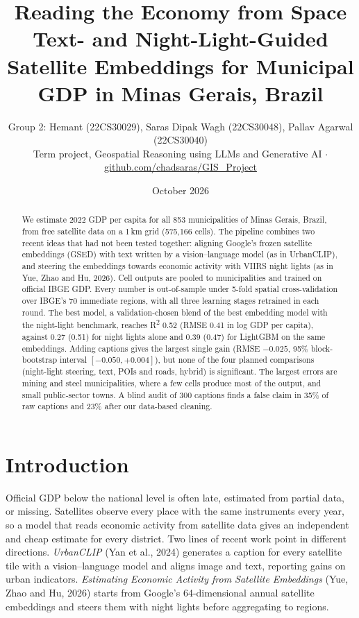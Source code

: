 \documentclass[11pt,a4paper]{article}
\title{\textbf{Reading the Economy from Space}\\[4pt]
\large Text- and Night-Light-Guided Satellite Embeddings for Municipal GDP in Minas Gerais, Brazil}
\author{Group 2: Hemant (22CS30029), Saras Dipak Wagh (22CS30048), Pallav Agarwal (22CS30040)\\[2pt]
\small Term project, Geospatial Reasoning using LLMs and Generative AI \quad$\cdot$\quad
\href{https://github.com/chadsaras/GIS_Project}{github.com/chadsaras/GIS\_Project}}
\date{October 2026}
\newcommand{\R}{R\textsuperscript{2}}
\begin{document}
\maketitle

\begin{abstract}
\noindent
We estimate 2022 GDP per capita for all 853 municipalities of Minas Gerais, Brazil, from free satellite data on a
1\,km grid (575{,}166 cells). The pipeline combines two recent ideas that had not been tested together: aligning
Google's frozen satellite embeddings (GSED) with text written by a vision--language model (as in UrbanCLIP), and
steering the embeddings towards economic activity with VIIRS night lights (as in Yue, Zhao and Hu, 2026).
Cell outputs are pooled to municipalities and trained on official IBGE GDP. Every number is out-of-sample under
5-fold spatial cross-validation over IBGE's 70 immediate regions, with all three learning stages retrained in each
round. The best model, a validation-chosen blend of the best embedding model with the night-light benchmark,
reaches \R{} 0.52 (RMSE 0.41 in log GDP per capita), against 0.27 (0.51) for night lights alone and 0.39 (0.47) for
LightGBM on the same embeddings. Adding captions gives the largest single gain (RMSE $-0.025$, 95\% block-bootstrap
interval $[-0.050, +0.004]$), but none of the four planned comparisons (night-light steering, text, POIs and roads,
hybrid) is significant. The largest errors are mining and steel municipalities, where a few cells produce most of
the output, and small public-sector towns. A blind audit of 300 captions finds a false claim in 35\% of raw
captions and 23\% after our data-based cleaning.
\end{abstract}

\section{Introduction}

Official GDP below the national level is often late, estimated from partial data, or missing. Satellites observe
every place with the same instruments every year, so a model that reads economic activity from satellite data gives
an independent and cheap estimate for every district. Two lines of recent work point in different directions.
\emph{UrbanCLIP} (Yan et al., 2024) generates a caption for every satellite tile with a vision--language model and
aligns image and text, reporting gains on urban indicators. \emph{Estimating Economic Activity from Satellite
Embeddings} (Yue, Zhao and Hu, 2026) starts from Google's 64-dimensional annual satellite embeddings and steers them
with night lights before aggregating to regions.
\end{document}
